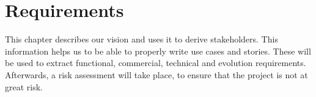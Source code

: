 \chapter{Requirements}
\label{ch:requirements}
This chapter describes our vision and uses it to derive stakeholders. This information helps us to be able to properly write use cases and stories. These will be used to extract functional, commercial, technical and evolution requirements. Afterwards, a risk assessment will take place, to ensure that the project is not at great risk.



















